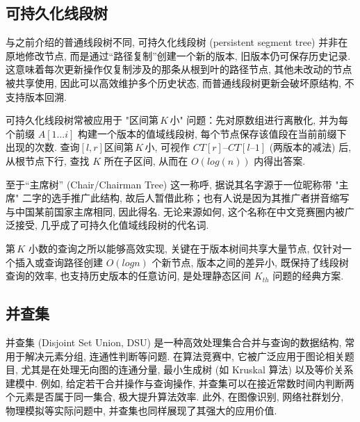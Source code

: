 \documentclass[a4paper]{ctexart}
\begin{document}


\subsection*{可持久化线段树}

与之前介绍的普通线段树不同, 可持久化线段树 (persistent segment tree) 并非在原地修改节点, 而是通过“路径复制”创建一个新的版本, 旧版本仍可保存历史记录. 这意味着每次更新操作仅复制涉及的那条从根到叶的路径节点, 其他未改动的节点被共享使用, 因此可以高效维护多个历史状态, 而普通线段树更新会破坏原结构, 不支持版本回溯. 

可持久化线段树常被应用于 "区间第 $K$ 小" 问题：先对原数组进行离散化, 并为每个前缀 $A[1\dots i]$ 构建一个版本的值域线段树, 每个节点保存该值段在当前前缀下出现的次数. 查询$[l,r]$区间第 $K$ 小, 可视作 $CT[r]–CT[l–1]$ (两版本的减法) 后, 从根节点下行, 查找 $K$ 所在子区间, 从而在 $O(log(n))$ 内得出答案. 

至于“主席树” (Chair/Chairman Tree) 这一称呼, 据说其名字源于一位昵称带 "主席" 二字的选手推广此结构, 故后人暂借此称；也有人说是因为其推广者拼音缩写与中国某前国家主席相同, 因此得名. 无论来源如何, 这个名称在中文竞赛圈内被广泛接受, 几乎成了可持久化值域线段树的代名词. 

第 $K$ 小数的查询之所以能够高效实现, 关键在于版本树间共享大量节点, 仅针对一个插入或查询路径创建 $O(log n)$ 个新节点, 版本之间的差异小, 既保持了线段树查询的效率, 也支持历史版本的任意访问, 是处理静态区间 $K_{th}$ 问题的经典方案. 



\subsection{并查集}

并查集 (Disjoint Set Union, DSU) 是一种高效处理集合合并与查询的数据结构, 常用于解决元素分组, 连通性判断等问题. 在算法竞赛中, 它被广泛应用于图论相关题目, 尤其是在处理无向图的连通分量, 最小生成树 (如 Kruskal 算法) 以及等价关系建模中. 例如, 给定若干合并操作与查询操作, 并查集可以在接近常数时间内判断两个元素是否属于同一集合, 极大提升算法效率. 此外, 在图像识别, 网络社群划分, 物理模拟等实际问题中, 并查集也同样展现了其强大的应用价值.


\end{document}
